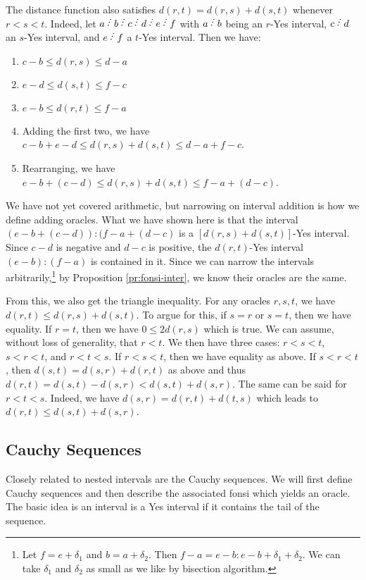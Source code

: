 \documentclass[12pt]{article}
\begin{document}
The distance function also satisfies $d(r,t) = d(r,s) + d(s,t)$ whenever $r < s < t$. Indeed, let $a\lte b\lte c\lte d\lte e\lte f$ with $a\lte b$ being an $r$-Yes interval, $c\lte d$ an $s$-Yes interval, and $e\lte f$ a $t$-Yes interval. Then we have: 
\begin{enumerate}
\item $c-b \leq d(r,s) \leq d-a$
\item $e-d \leq d(s,t) \leq f-c$
\item $e-b \leq d(r,t) \leq f-a$
\item Adding the first two, we have $c-b + e-d \leq d(r,s) + d(s,t) \leq d-a + f-c$.
\item Rearranging, we have $e-b + (c-d) \leq d(r,s) + d(s,t) \leq f-a + (d-c)$.
\end{enumerate}
We have not yet covered arithmetic, but narrowing on interval addition is how we define adding oracles. What we have shown here is that the interval $(e-b + (c-d)): (f-a + (d-c)$ is a $[d(r,s) + d(s,t)]$-Yes interval. Since $c-d$ is negative and $d-c$ is positive, the $d(r,t)$-Yes interval $(e-b):(f-a)$ is contained in it. Since we can narrow the intervals arbitrarily,\footnote{Let $f = e + \delta_1$ and $b = a + \delta_2$. Then $f-a = e-b:e-b + \delta_1 + \delta_2$. We can take $\delta_1$ and $\delta_2$ as small as we like by bisection algorithm.} by Proposition \ref{pr:fonsi-inter}, we know their oracles are the same. 

From this, we also get the triangle inequality. For any oracles $r, s, t$, we have $d(r,t) \leq d(r,s) + d(s,t)$.  To argue for this, if $s = r$ or $s=t$, then we have equality. If $r=t$, then we have $0 \leq 2 d(r,s)$ which is true. We can assume, without loss of generality, that $r < t$. We then have three cases: $r< s< t$, $s < r < t$, and $r< t  < s$. If $r < s< t$, then we have equality as above. If $s < r < t$, then $d(s,t) = d(s,r) + d(r,t)$ as above and thus $d(r,t) = d(s,t) - d(s,r) < d(s,t) + d(s,r)$. The same can be said for $r < t < s$. Indeed,  we have $d(s,r) = d(r,t) + d(t,s)$ which leads to $d(r,t) \leq d(s,t) + d(s,r)$.

\subsection{Cauchy Sequences}\label{sec:cauchy}

Closely related to nested intervals are the Cauchy sequences. We will first define Cauchy sequences and then describe the associated fonsi which yields an oracle. The basic idea is an interval is a Yes interval if it contains the tail of the sequence. 
\end{document}
